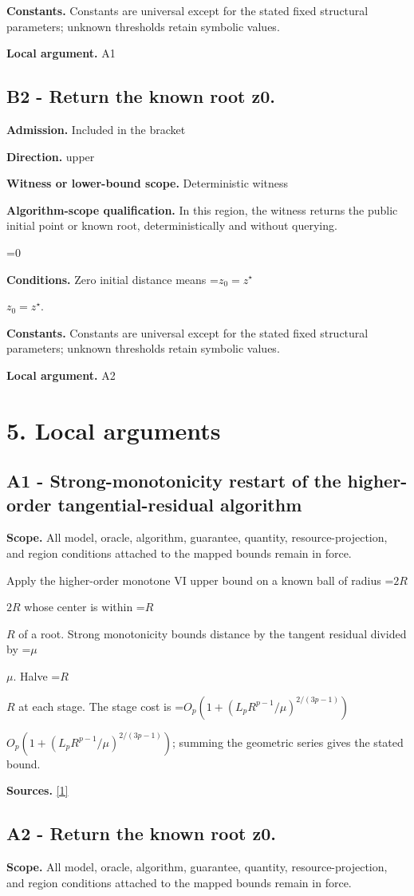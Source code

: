 \documentclass[10pt,a4paper]{article}
\newcommand{\AtlasMath}[1]{\par\begingroup\centering\setbox0=\hbox{$\displaystyle #1$}\ifdim\wd0>1.4\linewidth\typeout{ATLAS WIDE FORMULA: \the\wd0}\fi\ifdim\wd0>\linewidth\resizebox{\linewidth}{!}{\box0}\else\box0\fi\par\endgroup}
\newcommand{\AtlasInlineMath}[1]{\begingroup\setbox0=\hbox{$#1$}\ifdim\wd0>.4\linewidth\endgroup\AtlasMath{#1}\else\endgroup$#1$\fi}
\begin{document}
\textbf{Constants.} Constants are universal except for the stated fixed structural parameters; unknown thresholds retain symbolic values.

\textbf{Local argument.} A1

\subsection{B2 - Return the known root z0.}
\textbf{Admission.} Included in the bracket

\textbf{Direction.} upper

\textbf{Witness or lower-bound scope.} Deterministic witness

\textbf{Algorithm-scope qualification.} In this region, the witness returns the public initial point or known root, deterministically and without querying.

\AtlasMath{0}
\textbf{Conditions.} Zero initial distance means \AtlasInlineMath{z_0=z^\star}.

\textbf{Constants.} Constants are universal except for the stated fixed structural parameters; unknown thresholds retain symbolic values.

\textbf{Local argument.} A2

\section{5. Local arguments}
\subsection{A1 - Strong-monotonicity restart of the higher-order tangential-residual algorithm}
\textbf{Scope.} All model, oracle, algorithm, guarantee, quantity, resource-projection, and region conditions attached to the mapped bounds remain in force.

Apply the higher-order monotone VI upper bound on a known ball of radius \AtlasInlineMath{2R} whose center is within \AtlasInlineMath{R} of a root. Strong monotonicity bounds distance by the tangent residual divided by \AtlasInlineMath{\mu}. Halve \AtlasInlineMath{R} at each stage. The stage cost is \AtlasInlineMath{O_p(1+(L_pR^{p-1}/\mu)^{2/(3p-1)})}; summing the geometric series gives the stated bound.

\textbf{Sources.} \href{https://arxiv.org/pdf/2609.23557v1}{[1]}

\subsection{A2 - Return the known root z0.}
\textbf{Scope.} All model, oracle, algorithm, guarantee, quantity, resource-projection, and region conditions attached to the mapped bounds remain in force.
\end{document}
